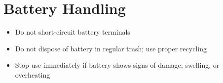 \section{Battery Handling}

\begin{itemize}
    \item Do not short-circuit battery terminals
    \item Do not dispose of battery in regular trash; use proper recycling
    \item Stop use immediately if battery shows signs of damage, swelling, or overheating
\end{itemize}






